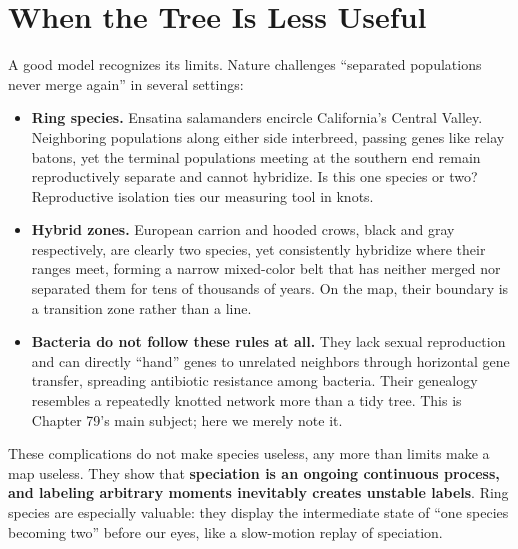\section{When the Tree Is Less Useful}

A good model recognizes its limits. Nature challenges ``separated populations never merge again'' in several settings:

\begin{itemize}[itemsep=2pt]
\item \textbf{Ring species.} Ensatina salamanders encircle California's Central Valley. Neighboring populations along either side interbreed, passing genes like relay batons, yet the terminal populations meeting at the southern end remain reproductively separate and cannot hybridize. Is this one species or two? Reproductive isolation ties our measuring tool in knots.
\item \textbf{Hybrid zones.} European carrion and hooded crows, black and gray respectively, are clearly two species, yet consistently hybridize where their ranges meet, forming a narrow mixed-color belt that has neither merged nor separated them for tens of thousands of years. On the map, their boundary is a transition zone rather than a line.
\item \textbf{Bacteria do not follow these rules at all.} They lack sexual reproduction and can directly ``hand'' genes to unrelated neighbors through horizontal gene transfer, spreading antibiotic resistance among bacteria. Their genealogy resembles a repeatedly knotted network more than a tidy tree. This is Chapter 79's main subject; here we merely note it.
\end{itemize}

These complications do not make species useless, any more than limits make a map useless. They show that \textbf{speciation is an ongoing continuous process, and labeling arbitrary moments inevitably creates unstable labels}. Ring species are especially valuable: they display the intermediate state of ``one species becoming two'' before our eyes, like a slow-motion replay of speciation.

